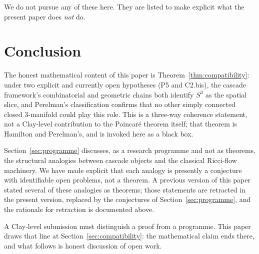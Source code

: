 \documentclass[11pt, a4paper]{amsart}
\theoremstyle{definition}
\begin{document}
We do not pursue any of these here. They are listed to make
explicit what the present paper does \emph{not} do.

\section{Conclusion}

The honest mathematical content of this paper is
Theorem~\ref{thm:compatibility}: under two explicit and currently
open hypotheses (P5 and C2.bis), the cascade framework's
combinatorial and geometric chains both identify $S^{3}$ as the
spatial slice, and Perelman's classification confirms that no
other simply connected closed $3$-manifold could play this role.
This is a three-way coherence statement, not a Clay-level
contribution to the Poincar\'{e} theorem itself; that theorem is
Hamilton and Perelman's, and is invoked here as a black box.

Section~\ref{sec:programme} discusses, as a research programme and
not as theorems, the structural analogies between cascade objects
and the classical Ricci-flow machinery. We have made explicit that
each analogy is presently a conjecture with identifiable open
problems, not a theorem. A previous version of this paper stated
several of these analogies as theorems; those statements are
retracted in the present version, replaced by the conjectures of
Section~\ref{sec:programme}, and the rationale for retraction is
documented above.

A Clay-level submission must distinguish a proof from a programme.
This paper draws that line at Section~\ref{sec:compatibility}: the
mathematical claim ends there, and what follows is honest
discussion of open work.
\end{document}
